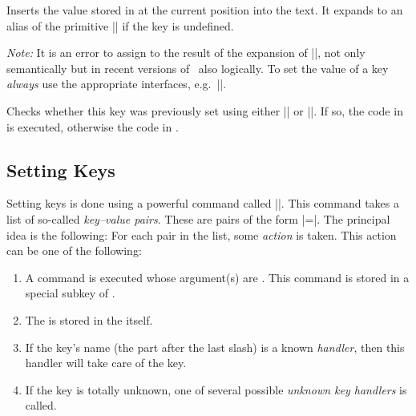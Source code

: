 \begin{command}{\pgfkeysvalueof{}}
    Inserts the value stored in  at the current position into the
    text. It expands to an alias of the primitive |\relax| if the key is undefined.
\begin{codeexample}[]
\end{codeexample}
    \emph{Note:} It is an error to assign to the result of the expansion of
    |\pgfkeysvalueof|, not only semantically but in recent versions of \pgfname\
    also logically. To set the value of a key \emph{always} use the appropriate
    interfaces, e.g.\ |\pgfkeyssetvalue|.
\end{command}

\begin{command}{\pgfkeysifdefined{}}
    Checks whether this key was previously set using either |\pgfkeyssetvalue|
    or |\pgfkeyslet|. If so, the code in \meta{if} is executed, otherwise the
    code in \meta{else}.
\begin{codeexample}[]
\end{codeexample}
\end{command}


\subsection{Setting Keys}

Setting keys is done using a powerful command called |\pgfkeys|. This command
takes a list of so-called \emph{key--value pairs}. These are pairs of the form
\meta{key}|=|\meta{value}. The principal idea is the following: For each pair
in the list, some \emph{action} is taken. This action can be one of the
following:
%
\begin{enumerate}
    \item A command is executed whose argument(s) are . This
        command is stored in a special subkey of .
    \item The \meta{value} is stored in the \meta{key} itself.
    \item If the key's name (the part after the last slash) is a known
        \emph{handler}, then this handler will take care of the key.
    \item If the key is totally unknown, one of several possible \emph{unknown
        key handlers} is called.
\end{enumerate}

